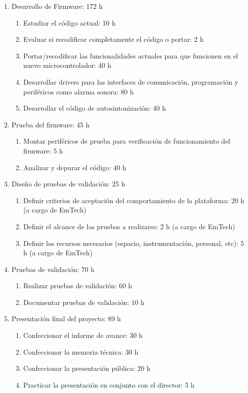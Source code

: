 \documentclass[
11pt, %
]{charter}
\begin{document}
\begin{enumerate}
\item Desarrollo de Firmware: 172 h
	\begin{enumerate}
	\item Estudiar el código actual: 10 h
	\item Evaluar si recodificar completamente el código o portar: 2 h
	\item Portar/recodificar las funcionalidades actuales para que funcionen en el nuevo microcontrolador: 40 h
	\item Desarrollar drivers para las interfaces de comunicación, programación y periféricos como alarma sonora: 80 h
	\item Desarrollar el código de autosintonización: 40 h
	\end{enumerate}

\item Prueba del firmware: 45 h
    \begin{enumerate}
    \item Montar periféricos de prueba para verificación de funcionamiento del firmware: 5 h
    \item Analizar y depurar el código: 40 h
    \end{enumerate}

\item Diseño de pruebas de validación: 25 h
    \begin{enumerate}
    \item Definir criterios de aceptación del comportamiento de la plataforma: 20 h (a cargo de EmTech)
    \item Definir el alcance de las pruebas a realizarse: 2 h (a cargo de EmTech)
    \item Definir los recursos necesarios (espacio, instrumentación, personal, etc): 5 h (a cargo de EmTech)
    
    \end{enumerate}
    
\item Pruebas de validación: 70 h
    \begin{enumerate}
    \item Realizar pruebas de validación: 60 h
    \item Documentar pruebas de validación: 10 h
    \end{enumerate}
    
\item Presentación final del proyecto: 89 h
    \begin{enumerate}
    \item Confeccionar el informe de avance: 30 h
    \item Confeccionar la memoria técnica: 30 h
    \item Confeccionar la presentación pública: 20 h
    \item Practicar la presentación en conjunto con el director: 5 h
    \end{enumerate}

  
\end{enumerate}
\end{document}
